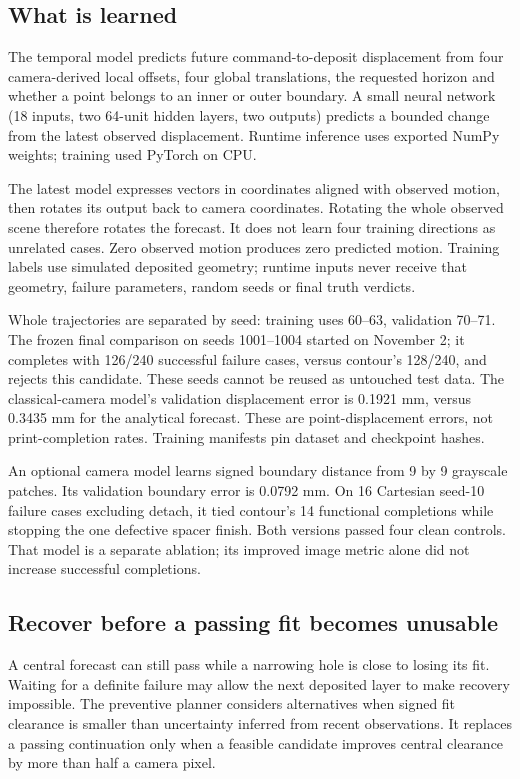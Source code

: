 \documentclass[10pt,letterpaper]{article}
\begin{document}
\subsection*{What is learned}
The temporal model predicts future command-to-deposit displacement from four
camera-derived local offsets, four global translations, the requested horizon
and whether a point belongs to an inner or outer boundary. A small neural
network (18 inputs, two 64-unit hidden layers, two outputs) predicts a bounded
change from the latest observed displacement. Runtime inference uses exported
NumPy weights; training used PyTorch on CPU.

The latest model expresses vectors in coordinates aligned with observed motion,
then rotates its output back to camera coordinates. Rotating the whole observed
scene therefore rotates the forecast. It does not learn four training directions
as unrelated cases. Zero observed motion produces zero predicted motion.
Training labels use simulated deposited geometry; runtime inputs never receive
that geometry, failure parameters, random seeds or final truth verdicts.

Whole trajectories are separated by seed: training uses 60--63, validation
70--71. The frozen final comparison on seeds 1001--1004 started on November 2;
it completes with 126/240 successful failure cases, versus contour's 128/240,
and rejects this candidate. These seeds cannot be reused as untouched test data. The
classical-camera model's validation displacement error is 0.1921 mm, versus
0.3435 mm for the analytical forecast. These are point-displacement errors,
not print-completion rates. Training manifests pin dataset and checkpoint hashes.

An optional camera model learns signed boundary distance from 9 by 9 grayscale
patches. Its validation boundary error is 0.0792 mm. On 16 Cartesian seed-10
failure cases excluding detach, it tied contour's 14 functional completions
while stopping the one defective spacer finish. Both versions passed four clean
controls. That model is a separate ablation; its improved image metric alone
did not increase successful completions.

\subsection*{Recover before a passing fit becomes unusable}
A central forecast can still pass while a narrowing hole is close to losing its
fit. Waiting for a definite failure may allow the next deposited layer to make
recovery impossible. The preventive planner considers alternatives when signed
fit clearance is smaller than uncertainty inferred from recent observations.
It replaces a passing continuation only when a feasible candidate improves
central clearance by more than half a camera pixel.
\end{document}
